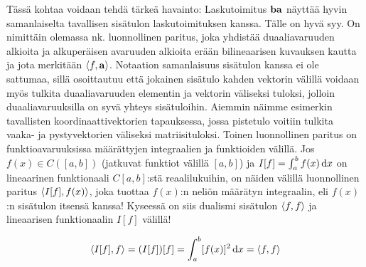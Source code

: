 \documentclass[../johdoksia.tex]{subfiles}
\begin{document}
	Tässä kohtaa voidaan tehdä tärkeä havainto: Laskutoimitus $\mathbf{b}\mathbf{a}$ näyttää hyvin samanlaiselta tavallisen sisätulon laskutoimituksen kanssa. Tälle on hyvä syy. On nimittäin olemassa nk. luonnollinen paritus, joka yhdistää duaaliavaruuden alkioita ja alkuperäisen avaruuden alkioita erään bilineaarisen kuvauksen kautta ja jota merkitään $\langle f,\mathbf{a}\rangle$. Notaation samanlaisuus sisätulon kanssa ei ole sattumaa, sillä osoittautuu että jokainen sisätulo kahden vektorin välillä voidaan myös tulkita duaaliavaruuden elementin ja vektorin väliseksi tuloksi, jolloin duaaliavaruuksilla on syvä yhteys sisätuloihin. Aiemmin näimme esimerkin tavallisten koordinaattivektorien tapauksessa, jossa pistetulo voitiin tulkita vaaka- ja pystyvektorien väliseksi matriisituloksi. Toinen luonnollinen paritus on funktioavaruuksissa määrättyjen integraalien ja funktioiden välillä. Jos $f(x) \in C([a, b])$ (jatkuvat funktiot välillä $[a, b]$) ja $I[f] = \int_{a}^{b}f(x)\odif{x}$ on lineaarinen funktionaali $C[a, b]$:stä reaalilukuihin, on näiden välillä luonnollinen paritus $\langle I[f],f(x)\rangle$, joka tuottaa $f(x)$:n neliön määrätyn integraalin, eli $f(x)$:n sisätulon itsensä kanssa! Kyseessä on siis dualismi sisätulon $\langle f,f\rangle$ ja lineaarisen funktionaalin $I[f]$ välillä!
	
	\begin{equation}
		\inprod{I[f]}{f} = (I[f])[f] = \int_{a}^{b}[f(x)]^2\odif{x} = \inprod{f}{f}
	\end{equation} 
	
	
	
	
\end{document}
